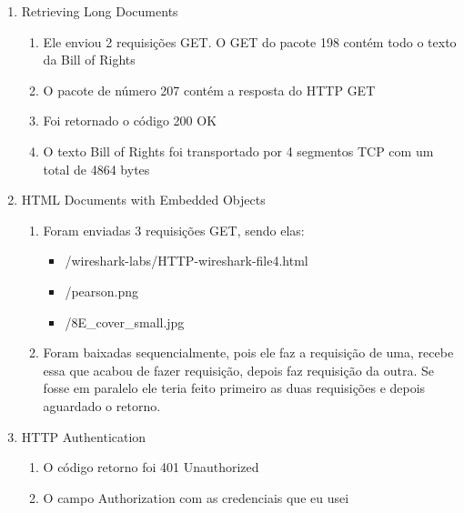 \documentclass[12pt,a4paper]{article}
\begin{document}
\begin{enumerate}[itemsep=1.5em]
\begin{enumerate}[label=\theenumi.\arabic*., itemsep=1em]
            \item Sim, pois após o cabeçalho do HTTP, está o próprio conteúdo do site
            
            \item Sim, ele vem com a data e hora da última modificação
            
            \item Código 304 Not Modified. O servidor não retornou nenhum conteúdo, apenas o cabeçalho HTTP.
        \end{enumerate}

    \item Retrieving Long Documents

        \begin{enumerate}[label=\theenumi.\arabic*., itemsep=1em]
            \item Ele enviou 2 requisições GET. O GET do pacote 198 contém todo o texto da Bill of Rights
            
            \item O pacote de número 207 contém a resposta do HTTP GET
            
            \item Foi retornado o código 200 OK
            
            \item O texto Bill of Rights foi transportado por 4 segmentos TCP com um total de 4864 bytes
        \end{enumerate}

    \item HTML Documents with Embedded Objects

        \begin{enumerate}[label=\theenumi.\arabic*., itemsep=1em]
            \item Foram enviadas 3 requisições GET, sendo elas:
            \begin{itemize}
                \item /wireshark-labs/HTTP-wireshark-file4.html
                \item /pearson.png
                \item /8E\_cover\_small.jpg
            \end{itemize}

            \item Foram baixadas sequencialmente, pois ele faz a requisição de uma, recebe essa que acabou de fazer requisição, depois faz requisição da outra. Se fosse em paralelo ele teria feito primeiro as duas requisições e depois aguardado o retorno.
        \end{enumerate}

    \item HTTP Authentication

        \begin{enumerate}[label=\theenumi.\arabic*., itemsep=1em]
            \item O código retorno foi 401 Unauthorized

            \item O campo Authorization com as credenciais que eu usei
        \end{enumerate}
    
\end{enumerate}
\end{document}
